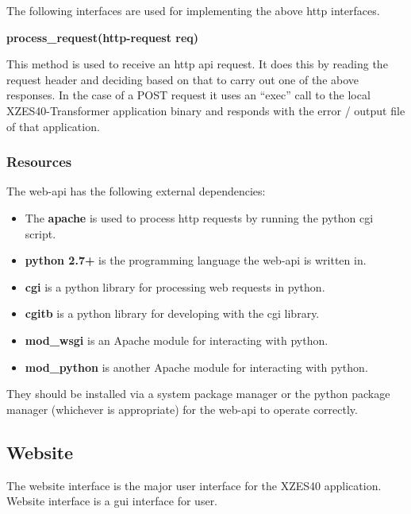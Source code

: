 \begin{enmerate}
\begin{itemzie}
The following interfaces are used for implementing the above \gls{http} interfaces.

\textbf{process\_request(http-request req)}

This method is used to receive an \gls{http} \gls{api} request.
It does this by reading the request header and deciding based on that to carry out one of the above responses.
In the case of a POST request it uses an ``exec'' call to the local XZES40-Transformer application binary and responds with the error / output file of that application.

\subsubsection{Resources}

The \gls{web-api} has the following external dependencies:

\begin{itemize}
  \item The \textbf{\gls{apache}} is used to process \gls{http} requests by running the \gls{python} \gls{cgi} script.
    \item \textbf{\gls{python} 2.7+} is the programming language the \gls{web-api} is written in.
    \item \textbf{cgi} is a \gls{python} library for processing web requests in \gls{python}.
    \item \textbf{cgitb} is a \gls{python} library for developing with the cgi library.
    \item \textbf{mod\_wsgi} is an Apache module for interacting with \gls{python}.
    \item \textbf{mod\_python} is another Apache module for interacting with \gls{python}.
\end{itemize}

They should be installed via a system package manager or the \gls{python} package manager (whichever is appropriate) for the \gls{web-api} to operate correctly.

\subsection{Website}
\label{website}

The website interface is the major user interface for the XZES40 application.
Website interface is a \gls{gui} interface for user.


\end{itemzie}
\end{enmerate}
